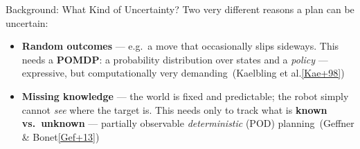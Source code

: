 \documentclass[aspectratio=169, 11pt]{beamer}
\newcommand{\rc}[2]{{\footnotesize\,(#1\;\hyperlink{ref:#2}{{\color{i6blue!60}[#2]}})}}
\begin{document}
\begin{frame}{Background: What Kind of Uncertainty?}
  \vspace{1mm}
  Two very different reasons a plan can be uncertain:
  \begin{itemize}[<+->]
    \item \textbf{Random outcomes} --- e.g.\ a move that occasionally slips
          sideways. This needs a \textbf{POMDP}: a probability distribution over
          states and a \emph{policy} --- expressive, but computationally very
          demanding \rc{Kaelbling et al.}{Kae+98}
    \item \textbf{Missing knowledge} --- the world is fixed and predictable; the
          robot simply cannot \emph{see} where the target is. This needs only to
          track what is \textbf{known vs.\ unknown} --- partially observable
          \emph{deterministic} (POD) planning \rc{Geffner \& Bonet}{Gef+13}
  \end{itemize}
  \vspace{1mm}
\end{frame}
\end{document}
